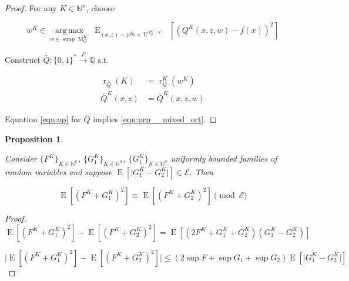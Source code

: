 \documentclass{article}
\numberwithin{equation}{section}
\theoremstyle{definition}
\theoremstyle{plain}
\newtheorem{proposition}{Proposition}[section]
\newcommand{\Bool}{\{0,1\}}
\newcommand{\Words}{{\Bool^*}}
\DeclareMathOperator{\Supp}{supp}
\DeclareMathOperator{\E}{E}
\DeclareMathOperator{\R}{r}
\DeclareMathOperator{\M}{M}
\DeclareMathOperator{\Un}{U}
\newcommand{\Argmax}[1]{\underset{#1}{\operatorname{arg\,max}}\,}
\newcommand{\Nats}{\mathbb{N}}
\newcommand{\Rats}{\mathbb{Q}}
\newcommand{\Abs}[1]{\lvert #1 \rvert}
\newcommand{\Fall}{\mathcal{E}}
\newcommand{\Scheme}{\xrightarrow{\Gamma}}
\begin{document}
\begin{proof}

For any ${K \in \Nats^n}$, choose 

\[w^K \in \Argmax{w \in \Supp \M_Q^K} \E_{(x,z) \sim \mu^{K_0} \times \Un^{\R_Q^K(w)}}[(Q^K(x,z,w)-f(x))^2]\]

Construct ${\bar{Q}: \Words \Scheme \Rats}$ s.t.

\begin{align*}
\R_{\bar{Q}}(K) &= \R_Q^K(w^K) \\
\bar{Q}^K(x,z) &= \bar{Q}^K(x,z,w)
\end{align*}

Equation \ref{eqn:op} for ${\bar{Q}}$ implies \ref{eqn:prp__mixed_ort}.
%
\end{proof}

\begin{samepage}
\begin{proposition}
\label{prp:sq_diff_cong}

Consider $\{F^K\}_{K \in \Nats^n}$, $\{G_1^K\}_{K \in \Nats^n}$, $\{G_1^K\}_{K \in \Nats^n}$ uniformly bounded families of random variables and suppose ${\E[\Abs{G_1^K - G_2^K}] \in \Fall}$. Then

\begin{equation}
\E[(F^K + G_1^K)^2] \equiv \E[(F^K + G_2^K)^2] \pmod \Fall
\end{equation}

\end{proposition}
\end{samepage}

\begin{proof}

\[\E[(F^K + G_1^K)^2] - \E[(F^K + G_2^K)^2] = \E[(2 F^K + G_1^K + G_2^K)(G_1^K - G_2^K)]\]

\[\Abs{\E[(F^K + G_1^K)^2] - \E[(F^K + G_2^K)^2]} \leq (2 \sup F + \sup G_1 + \sup G_2) \E[\Abs{G_1^K - G_2^K}]\]
%
\end{proof}
\end{document}
